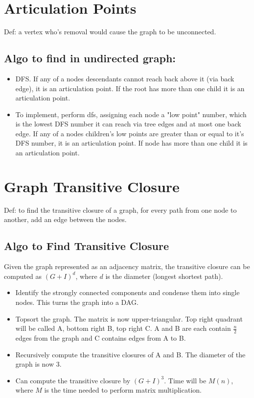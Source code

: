 \documentclass[7pt,twocolumn]{article}
\begin{document}
\section{ Articulation Points }
Def: a vertex who's removal would cause the graph to be unconnected.

\subsection{ Algo to find in undirected graph: }
\begin{itemize}
    \item DFS. If any of a nodes descendants cannot reach back above it (via
        back edge), it is an articulation point. If the root has more than one
        child it is an articulation point.

    \item To implement, perform dfs, assigning each node a "low point" number,
        which is the lowest DFS number it can reach via tree edges and at most
        one back edge. If any of a nodes children's low points are greater than
        or equal to it's DFS number, it is an articulation point. If node has
        more than one child it is an articulation point.
\end{itemize}

\section{ Graph Transitive Closure }
\label{sec:_graph_transitive_closure_}

Def: to find the transitive closure of a graph, for every path from one node to
another, add an edge between the nodes.

\subsection{ Algo to Find Transitive Closure }
\label{sub:_algo_to_find_transitive_closure_}

Given the graph represented as an adjacency matrix, the transitive closure can
be computed as $(G + I)^d$, where $d$ is the diameter (longest shortest path).

\begin{itemize}
    \item Identify the strongly connected components and condense them into
        single nodes. This turns the graph into a DAG.
    \item Topsort the graph. The matrix is now upper-triangular. Top right
        quadrant will be called A, bottom right B, top right C. A and B are each
        contain $\frac{n}{2}$ edges from the graph and C contains edges from A
        to B.
    \item Recursively compute the transitive closures of A and B. The diameter
         of the graph is now 3.
    \item Can compute the transitive closure by $(G + I)^3$. Time will be
        $M(n)$, where $M$ is the time needed to perform matrix multiplication.
\end{itemize}




\end{document}
